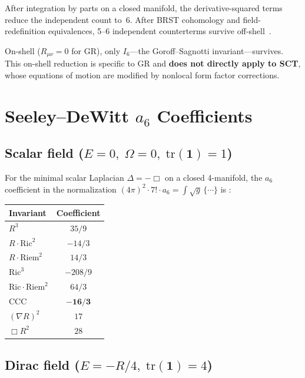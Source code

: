 \documentclass[11pt,a4paper]{article}
\begin{document}
After integration by parts on a closed manifold, the derivative-squared terms
reduce the independent count to~6.  After BRST cohomology and
field-redefinition equivalences, 5--6 independent counterterms survive
off-shell~\cite{Barnich:1994,Lavrov:2022}.

On-shell ($R_{\mu\nu}=0$ for GR), only $I_6$---the Goroff--Sagnotti
invariant---survives.  This on-shell reduction is specific to GR and
\textbf{does not directly apply to SCT}, whose equations of motion are
modified by nonlocal form factor corrections.


\section{Seeley--DeWitt $a_6$ Coefficients}
\label{sec:a6}

\subsection{Scalar field ($E=0,\;\Omega=0,\;\mathrm{tr}(\mathbf{1})=1$)}

For the minimal scalar Laplacian $\Delta=-\Box$ on a closed 4-manifold,
the $a_6$ coefficient in the normalization
$(4\pi)^2\cdot 7!\cdot a_6 = \int\!\sqrt{g}\,\{\cdots\}$ is
\cite{Gilkey:1975,Vassilevich:2003}:

\begin{center}
\begin{tabular}{l c}
\toprule
Invariant & Coefficient \\
\midrule
$R^3$ & $35/9$ \\
$R\cdot\mathrm{Ric}^2$ & $-14/3$ \\
$R\cdot\mathrm{Riem}^2$ & $14/3$ \\
$\mathrm{Ric}^3$ & $-208/9$ \\
$\mathrm{Ric}\cdot\mathrm{Riem}^2$ & $64/3$ \\
CCC & $\mathbf{-16/3}$ \\
$(\nabla R)^2$ & $17$ \\
$\Box R^2$ & $28$ \\
\bottomrule
\end{tabular}
\end{center}

\subsection{Dirac field ($E=-R/4,\;\mathrm{tr}(\mathbf{1})=4$)}
\end{document}
